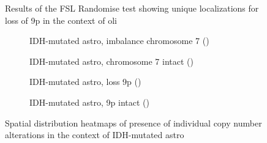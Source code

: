 \begin{figure}[htbp]
    \centering
    \caption{Results of the \acrshort{FSL} Randomise test showing unique localizations for loss of 9p in the context of \gls{oli}}\label{fig:LGG_location_p_value_9p}
\end{figure}

\begin{figure}[htbp]
    \centering
    \begin{subfigure}[b]{\textwidth}
        \caption{\acrshort{IDH}-mutated \gls{astro}, imbalance chromosome 7 ()}\label{fig:LGG_location_heatmap_astro_chr_7_imbalance}
    \end{subfigure}
    \begin{subfigure}[b]{\textwidth}
        \caption{\acrshort{IDH}-mutated \gls{astro}, chromosome 7 intact ()}\label{fig:LGG_location_heatmap_astro_chr_7_intact}
    \end{subfigure}
    \begin{subfigure}[b]{\textwidth}
        \caption{\acrshort{IDH}-mutated \gls{astro}, loss 9p ()}\label{fig:LGG_location_heatmap_astro_chr_9_loss}
    \end{subfigure}
    \begin{subfigure}[b]{\textwidth}
        \caption{\acrshort{IDH}-mutated \gls{astro}, 9p intact ()}\label{fig:LGG_location_heatmap_astro_chr_9_intact}
    \end{subfigure}
    \caption{Spatial distribution heatmaps of presence of individual copy number alterations in the context of \acrshort{IDH}-mutated \gls{astro}}\label{fig:LGG_location_heatmap_chromosome_7_9}
\end{figure}

